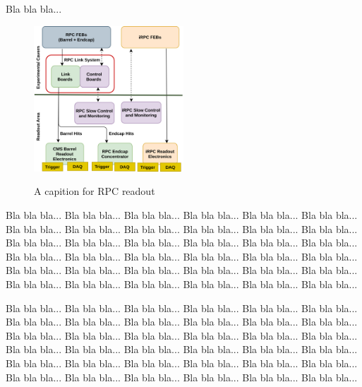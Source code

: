 Bla bla bla...


\begin{figure}
    \caption{A capition for RPC readout}
    \includegraphics[width=0.5\textwidth]{uioposter-images/rpc_phase2_readout.png}
    \label{rpc_phase2_readout}
\end{figure}


Bla bla bla... Bla bla bla... Bla bla bla... Bla bla bla... Bla bla bla... Bla bla bla... Bla bla bla... Bla bla bla... Bla bla bla... Bla bla bla... Bla bla bla... Bla bla bla... Bla bla bla... Bla bla bla... Bla bla bla... Bla bla bla... Bla bla bla... Bla bla bla... Bla bla bla... Bla bla bla... Bla bla bla... Bla bla bla... Bla bla bla... Bla bla bla... Bla bla bla... Bla bla bla... Bla bla bla... Bla bla bla... Bla bla bla... Bla bla bla... Bla bla bla... Bla bla bla... Bla bla bla... Bla bla bla... Bla bla bla... Bla bla bla... 

Bla bla bla... Bla bla bla... Bla bla bla... Bla bla bla... Bla bla bla... Bla bla bla... Bla bla bla... Bla bla bla... Bla bla bla... Bla bla bla... Bla bla bla... Bla bla bla... Bla bla bla... Bla bla bla... Bla bla bla... Bla bla bla... Bla bla bla... Bla bla bla... Bla bla bla... Bla bla bla... Bla bla bla... Bla bla bla... Bla bla bla... Bla bla bla... Bla bla bla... Bla bla bla... Bla bla bla... Bla bla bla... Bla bla bla... Bla bla bla... Bla bla bla... Bla bla bla... Bla bla bla... Bla bla bla... Bla bla bla... Bla bla bla... 